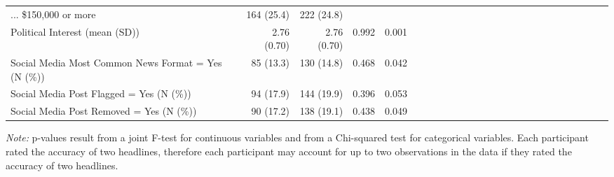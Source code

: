 \begin{table}[!htbp]
{\begin{threeparttable}
\begin{tabular}[t]{l|r|r|r|rl|r|r|r|rl|r|r|r|rl|r|r|r|rl|r|r|r|r}
... \$150,000 or more & 164 (25.4) & 222 (24.8) &  & \\
Political Interest (mean (SD)) & 2.76 (0.70) & 2.76 (0.70) & 0.992 & 0.001\\
Social Media Most Common News Format = Yes (N (\%)) & 85 (13.3) & 130 (14.8) & 0.468 & 0.042\\
Social Media Post Flagged = Yes (N (\%)) & 94 (17.9) & 144 (19.9) & 0.396 & 0.053\\
Social Media Post Removed = Yes (N (\%)) & 90 (17.2) & 138 (19.1) & 0.438 & 0.049\\
\bottomrule
\end{tabular}
\begin{tablenotes}
\item \small{\textit{Note:} p-values result from a joint F-test for continuous variables and from a Chi-squared test for categorical variables. Each participant rated the accuracy of two headlines, therefore each participant may account for up to two observations in the data if they rated the accuracy of two headlines.}
\end{tablenotes}
\end{threeparttable}}
\end{table}